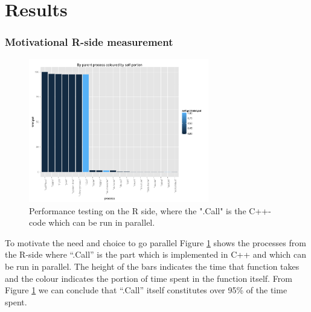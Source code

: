 \section{Results}

\subsubsection{Motivational R-side measurement}

\begin{figure}[!htbp] \centering
  \includegraphics[width=0.7\textwidth]{images/parentColByPortion.pdf}
  \caption{Performance testing on the R side, where the ".Call" is the
C++-code which can be run in parallel.}
  \label{fig:rMot}
\end{figure}

To motivate the need and choice to go parallel Figure \ref{fig:rMot}
shows the processes from the R-side where ``.Call'' is the part which
is implemented in C++ and which can be run in parallel. The height of
the bars indicates the time that function takes and the colour
indicates the portion of time spent in the function itself. From
Figure \ref{fig:rMot} we can conclude that ``.Call'' itself
constitutes over 95\% of the time spent.

